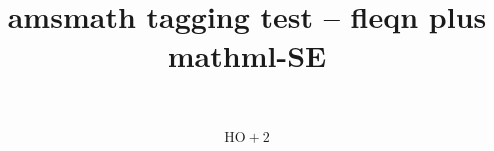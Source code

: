 \documentclass{article}
\title{amsmath tagging test -- fleqn plus mathml-SE}
\begin{document}
\begin{equation}
\mathrm{H} \mathrm{O} +2
\end{equation}
\end{document}
